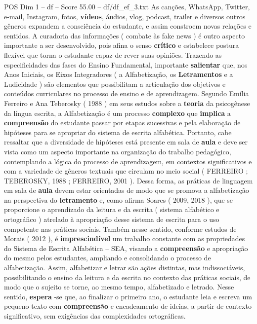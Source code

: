 \begin{textsample}{POS Dim 1 – df – Score 55.00 – df/df\_ef\_3.txt}
As canções, WhatsApp, Twitter, e-mail, Instagram, fotos, \textbf{vídeos}, áudios, vlog, podcast, trailer e diversos outros gêneros expandem a consciência do estudante, e assim constroem novas relações e sentidos.
A curadoria das informações ( combate às fake news ) é outro aspecto importante a ser desenvolvido, pois afina o senso \textbf{crítico} e estabelece postura flexível que torna o estudante capaz de rever suas opiniões.
Trazendo as especificidades das fases do Ensino Fundamental, importante \textbf{salientar} que, nos Anos Iniciais, os Eixos Integradores ( a Alfabetização, os \textbf{Letramentos} e a Ludicidade ) são elementos que possibilitam a articulação dos objetivos e conteúdos curriculares no processo de ensino e de aprendizagem.
Segundo Emília Ferreiro e Ana Teberosky ( 1988 ) em seus estudos sobre a \textbf{teoria} da psicogênese da língua escrita, a Alfabetização é um processo \textbf{complexo} que \textbf{implica} a \textbf{compreensão} do estudante passar por etapas sucessivas e pela elaboração de hipóteses para se apropriar do sistema de escrita alfabética.
Portanto, cabe ressaltar que a diversidade de hipóteses está presente em sala de \textbf{aula} e deve ser vista como um aspecto importante na organização do trabalho pedagógico, contemplando a lógica do processo de aprendizagem, em contextos significativos e com a variedade de gêneros textuais que circulam no meio social ( FERREIRO ; TEBEROSKY, 1988 ; FERREIRO, 2001 ).
Dessa forma, as práticas de linguagem em sala de \textbf{aula} devem estar orientadas de modo que se promova a alfabetização na perspectiva do \textbf{letramento} e, como afirma Soares ( 2009, 2018 ), que se proporcione o aprendizado da leitura e da escrita ( sistema alfabético e ortográfico ) atrelado à apropriação desse sistema de escrita para o uso competente nas práticas sociais.
Também nesse sentido, conforme estudos de Morais ( 2012 ), é \textbf{imprescindível} um trabalho constante com as propriedades do Sistema de Escrita Alfabética – SEA, visando a \textbf{compreensão} e apropriação do mesmo pelos estudantes, ampliando e consolidando o processo de alfabetização.
Assim, alfabetizar e letrar são ações distintas, mas indissociáveis, possibilitando o ensino da leitura e da escrita no contexto das práticas sociais, de modo que o sujeito se torne, ao mesmo tempo, alfabetizado e letrado.
Nesse sentido, \textbf{espera} -se que, ao finalizar o primeiro ano, o estudante leia e escreva um pequeno texto com \textbf{compreensão} e encadeamento de ideias, a partir de contexto significativo, sem exigências das complexidades ortográficas.

\end{textsample}
